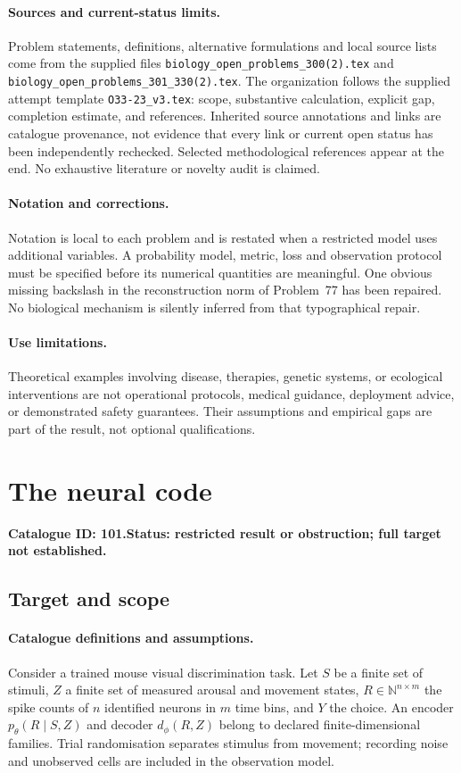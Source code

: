 \documentclass[11pt]{article}
\newcommand{\N}{\mathbb N}
\providecommand{\N}{\mathbb N}
\begin{document}
\paragraph{Sources and current-status limits.}
Problem statements, definitions, alternative formulations and local source lists
come from the supplied files
\texttt{biology\_open\_problems\_300(2).tex} and
\texttt{biology\_open\_problems\_301\_330(2).tex}.
The organization follows the supplied attempt template
\texttt{O33-23\_v3.tex}: scope, substantive calculation, explicit gap,
completion estimate, and references. Inherited source annotations and links are
catalogue provenance, not evidence that every link or current open status has
been independently rechecked. Selected methodological references appear at the
end. No exhaustive literature or novelty audit is claimed.

\paragraph{Notation and corrections.}
Notation is local to each problem and is restated when a restricted model uses
additional variables. A probability model, metric, loss and observation protocol
must be specified before its numerical quantities are meaningful. One obvious
missing backslash in the reconstruction norm of Problem~77 has been repaired.
No biological mechanism is silently inferred from that typographical repair.

\paragraph{Use limitations.}
Theoretical examples involving disease, therapies, genetic systems, or ecological
interventions are not operational protocols, medical guidance, deployment advice,
or demonstrated safety guarantees. Their assumptions and empirical gaps are part
of the result, not optional qualifications.

\setcounter{section}{100}
\section{The neural code}
\label{prob:101}
\noindent\textbf{Catalogue ID: 101.}\quad \textbf{Status: restricted result or obstruction; full target not established.}
\subsection{Target and scope}
\paragraph{Catalogue definitions and assumptions.}
Consider a trained mouse visual discrimination task. Let $S$ be a finite set of stimuli, $Z$ a finite set of measured arousal and movement states, $R\in\N^{n\times m}$ the spike counts of $n$ identified neurons in $m$ time bins, and $Y$ the choice. An encoder $p_\theta(R\mid S,Z)$ and decoder $d_\phi(R,Z)$ belong to declared finite-dimensional families. Trial randomisation separates stimulus from movement; recording noise and unobserved cells are included in the observation model.
\end{document}
